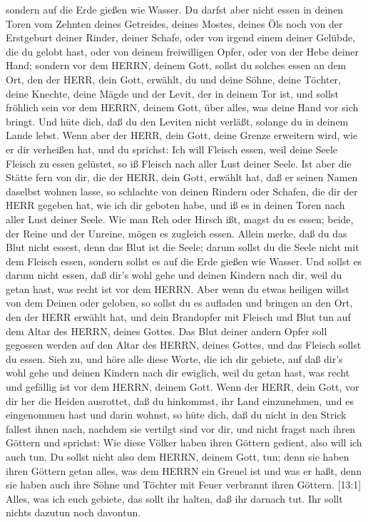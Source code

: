 sondern auf die Erde gießen wie Wasser.  Du darfst aber
nicht essen in deinen Toren vom Zehnten deines Getreides, deines Mostes,
deines Öls noch von der Erstgeburt deiner Rinder, deiner Schafe, oder
von irgend einem deiner Gelübde, die du gelobt hast, oder von deinem
freiwilligen Opfer, oder von der Hebe deiner Hand;  sondern
vor dem HERRN, deinem Gott, sollst du solches essen an dem Ort, den der
HERR, dein Gott, erwählt, du und deine Söhne, deine Töchter, deine
Knechte, deine Mägde und der Levit, der in deinem Tor ist, und sollst
fröhlich sein vor dem HERRN, deinem Gott, über alles, was deine Hand vor
sich bringt.  Und hüte dich, daß du den Leviten nicht
verläßt, solange du in deinem Lande lebst.  Wenn aber der
HERR, dein Gott, deine Grenze erweitern wird, wie er dir verheißen hat,
und du sprichst: Ich will Fleisch essen, weil deine Seele Fleisch zu
essen gelüstet, so iß Fleisch nach aller Lust deiner Seele.
 Ist aber die Stätte fern von dir, die der HERR, dein Gott,
erwählt hat, daß er seinen Namen daselbst wohnen lasse, so schlachte von
deinen Rindern oder Schafen, die dir der HERR gegeben hat, wie ich dir
geboten habe, und iß es in deinen Toren nach aller Lust deiner Seele.
 Wie man Reh oder Hirsch ißt, magst du es essen; beide, der
Reine und der Unreine, mögen es zugleich essen.  Allein
merke, daß du das Blut nicht essest, denn das Blut ist die Seele; darum
sollst du die Seele nicht mit dem Fleisch essen,  sondern
sollst es auf die Erde gießen wie Wasser.  Und sollst es
darum nicht essen, daß dir's wohl gehe und deinen Kindern nach dir, weil
du getan hast, was recht ist vor dem HERRN.  Aber wenn du
etwas heiligen willst von dem Deinen oder geloben, so sollst du es
aufladen und bringen an den Ort, den der HERR erwählt hat, 
und dein Brandopfer mit Fleisch und Blut tun auf dem Altar des HERRN,
deines Gottes. Das Blut deiner andern Opfer soll gegossen werden auf den
Altar des HERRN, deines Gottes, und das Fleisch sollst du essen.
 Sieh zu, und höre alle diese Worte, die ich dir gebiete,
auf daß dir's wohl gehe und deinen Kindern nach dir ewiglich, weil du
getan hast, was recht und gefällig ist vor dem HERRN, deinem Gott.
 Wenn der HERR, dein Gott, vor dir her die Heiden
ausrottet, daß du hinkommst, ihr Land einzunehmen, und es eingenommen
hast und darin wohnst,  so hüte dich, daß du nicht in den
Strick fallest ihnen nach, nachdem sie vertilgt sind vor dir, und nicht
fragst nach ihren Göttern und sprichst: Wie diese Völker haben ihren
Göttern gedient, also will ich auch tun.  Du sollst nicht
also dem HERRN, deinem Gott, tun; denn sie haben ihren Göttern getan
alles, was dem HERRN ein Greuel ist und was er haßt, denn sie haben auch
ihre Söhne und Töchter mit Feuer verbrannt ihren Göttern. 
{[}13:1{]} Alles, was ich euch gebiete, das sollt ihr halten, daß ihr
darnach tut. Ihr sollt nichts dazutun noch davontun.

